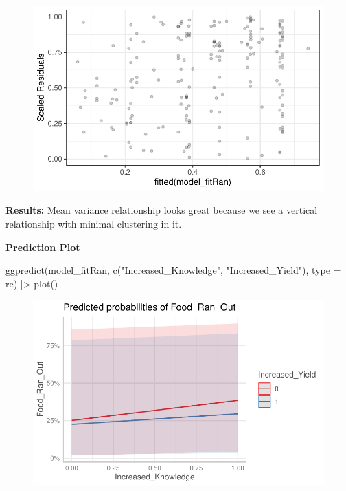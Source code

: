 \documentclass[
  letterpaper,
  DIV=11,
  numbers=noendperiod]{scrartcl}
\newenvironment{Shaded}{\begin{snugshade}}{\end{snugshade}}
\newcommand{\AttributeTok}[1]{\textcolor[rgb]{0.40,0.45,0.13}{#1}}
\newcommand{\FunctionTok}[1]{\textcolor[rgb]{0.28,0.35,0.67}{#1}}
\newcommand{\NormalTok}[1]{\textcolor[rgb]{0.00,0.23,0.31}{#1}}
\newcommand{\SpecialCharTok}[1]{\textcolor[rgb]{0.37,0.37,0.37}{#1}}
\newcommand{\StringTok}[1]{\textcolor[rgb]{0.13,0.47,0.30}{#1}}
\begin{document}
\begin{itemize}
  \begin{figure}[H]

  {\centering \includegraphics{Empircal-Research-final_files/figure-pdf/unnamed-chunk-8-1.pdf}

  }

  \end{figure}

  \textbf{Results:} Mean variance relationship looks great because we
  see a vertical relationship with minimal clustering in it.

  \textbf{Prediction Plot}

\begin{Shaded}
\begin{Highlighting}[]
\FunctionTok{ggpredict}\NormalTok{(model\_fitRan, }
          \FunctionTok{c}\NormalTok{(}\StringTok{"Increased\_Knowledge"}\NormalTok{, }\StringTok{"Increased\_Yield"}\NormalTok{), }
          \AttributeTok{type =} \StringTok{\textquotesingle{}re\textquotesingle{}}\NormalTok{) }\SpecialCharTok{|\textgreater{}} 
  \FunctionTok{plot}\NormalTok{() }
\end{Highlighting}
\end{Shaded}

  \begin{figure}[H]

  {\centering \includegraphics{Empircal-Research-final_files/figure-pdf/unnamed-chunk-9-1.pdf}

}
\end{figure}
\end{itemize}
\end{document}

